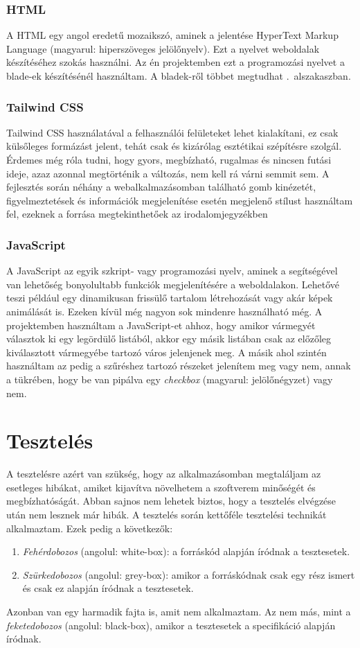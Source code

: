 \documentclass[]{thesis-ekf}
\theoremstyle{definition}
\theoremstyle{remark}
\begin{document}
	\subsection{HTML}
		A HTML egy angol eredetű mozaikszó, aminek a jelentése HyperText Markup Language (magyarul: hiperszöveges jelölőnyelv). Ezt a nyelvet weboldalak készítéséhez szokás használni. Az én projektemben ezt a programozási nyelvet a blade-ek készítésénél használtam. A bladek-ről többet megtudhat .~alszakaszban.   
	\subsection{Tailwind CSS}\label{sc-tailwind}
		Tailwind CSS használatával a felhasználói felületeket lehet kialakítani, ez csak külsőleges formázást jelent, tehát csak és kizárólag esztétikai szépítésre szolgál. Érdemes még róla tudni, hogy gyors, megbízható, rugalmas és nincsen futási ideje, azaz azonnal megtörténik a változás, nem kell rá várni semmit sem. A fejlesztés során néhány a webalkalmazásomban található gomb kinézetét, figyelmeztetések és információk megjelenítése esetén megjelenő stílust használtam fel, ezeknek a forrása megtekinthetőek az irodalomjegyzékben \cite{tailwind, FlowBite}
	\subsection{JavaScript}\label{javascript}
		A JavaScript az egyik szkript- vagy programozási nyelv, aminek a segítségével van lehetőség bonyolultabb funkciók megjelenítésére a weboldalakon. Lehetővé teszi például egy dinamikusan frissülő tartalom létrehozását vagy akár képek animálását is. Ezeken kívül még nagyon sok mindenre használható még. A projektemben használtam a JavaScript-et ahhoz, hogy amikor vármegyét választok ki egy legördülő listából, akkor egy másik listában csak az előzőleg kiválasztott vármegyébe tartozó város jelenjenek meg. A másik ahol szintén használtam az pedig a szűréshez tartozó részeket jelenítem meg vagy nem, annak a tükrében, hogy be van pipálva egy \emph{checkbox} (magyarul: jelölőnégyzet) vagy nem. \cite{JavaScript}
		
	\chapter{Tesztelés}
		A tesztelésre azért van szükség, hogy az alkalmazásomban megtaláljam az esetleges hibákat, amiket kijavítva növelhetem a szoftverem minőségét és megbízhatóságát. Abban sajnos nem lehetek biztos, hogy a tesztelés elvégzése után nem lesznek már hibák. A tesztelés során kettőféle tesztelési technikát alkalmaztam. Ezek pedig a következők:
		\begin{enumerate}
			\item \emph{Fehérdobozos} (angolul: white-box): a forráskód alapján íródnak a tesztesetek.
			\item \emph{Szürkedobozos} (angolul: grey-box): amikor a forráskódnak csak egy rész ismert és csak ez alapján íródnak a tesztesetek.
		\end{enumerate}
		Azonban van egy harmadik fajta is, amit nem alkalmaztam. Az nem más, mint a \emph{feketedobozos} (angolul: black-box), amikor a tesztesetek a specifikáció alapján íródnak.
		\cite{Kusper}
\end{document}
